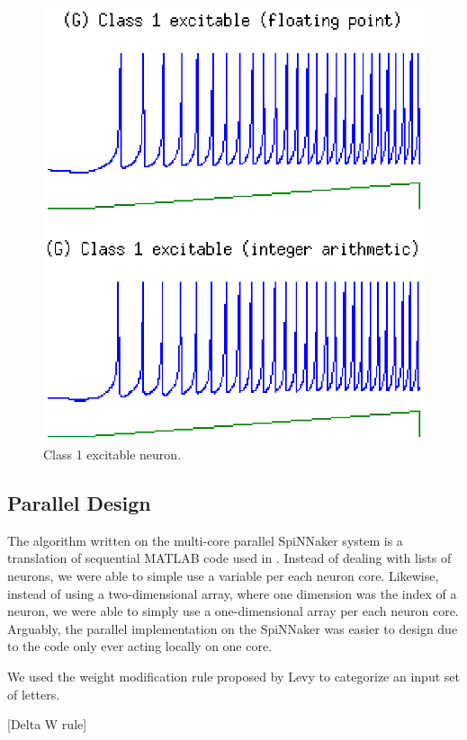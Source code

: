 \documentclass[journal]{./sty/IEEEtran}
\begin{document}
\begin{figure}
\centering
\includegraphics[scale=0.6]{imgs/izh_class_1_excitable}
\caption{Class 1 excitable neuron.\label{fig:excit1}}
\end{figure}


\subsection{Parallel Design}
The algorithm written on the multi-core parallel SpiNNaker system is a translation of sequential MATLAB code used in \cite{Polychron:Izhi}.
Instead of dealing with lists of neurons, we were able to simple use a variable per each neuron core.
Likewise, instead of using a two-dimensional array, where one dimension was the index of a neuron, 
we were able to simply use a one-dimensional array per each neuron core.
Arguably, the parallel implementation on the SpiNNaker was easier to design due to the code only ever acting locally on one core.


We used the weight modification rule proposed by Levy to categorize an input set of letters. 

\vspace{0.5cm}
[Delta W rule]
\vspace{0.5cm}
\end{document}
